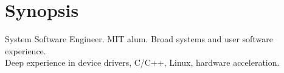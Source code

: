 \section{Synopsis}
System Software Engineer. MIT alum. Broad systems and user software experience. \\
Deep experience in device drivers, C/C++, Linux, hardware acceleration.
